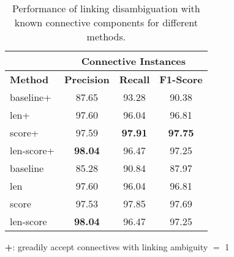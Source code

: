 \begin{table}[ht]
\centering
\begin{tabular}{|l|c|c|c|}
\hline
                            & \multicolumn{3}{c|}{Connective Instances}  \\ \hline
\bf Method                  & \bf Precision & \bf Recall & \bf F1-Score  \\ \hline
    baseline+               &     87.65     &     93.28  &     90.38     \\ \hline
    len+                    &     97.60     &     96.04  &     96.81     \\ \hline
    score+                  &     97.59     & \bf 97.91  & \bf 97.75     \\ \hline
    len-score+              & \bf 98.04     &     96.47  &     97.25     \\


\hhline{|=|=|=|=|}

    baseline                &     85.28     &     90.84  &     87.97     \\ \hline
    len                     &     97.60     &     96.04  &     96.81     \\ \hline
    score                   &     97.53     &     97.85  &     97.69     \\ \hline
    len-score               & \bf 98.04     &     96.47  &     97.25     \\ \hline

\end{tabular}
\begin{flushleft}
\small
\textbf{+}: greadily accept connectives with linking ambiguity $=$ 1
\end{flushleft}
\caption{\label{t:linking-perfect-methods} Performance of linking
disambiguation with known connective components for different methods. }
\end{table}

